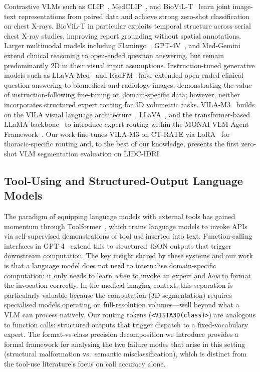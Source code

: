 \documentclass[lineno,referee,pdflatex,sn-mathphys-num]{sn-jnl}
\begin{document}
Contrastive VLMs such as CLIP~\cite{clip2021}, MedCLIP~\cite{medclip2022},
and BioViL-T~\cite{biovilt2023} learn joint image-text representations from
paired data and achieve strong zero-shot classification on chest X-rays.
BioViL-T in particular exploits temporal structure across serial chest X-ray
studies, improving report grounding without spatial annotations.
Larger multimodal models including Flamingo~\cite{flamingo2022},
GPT-4V~\cite{gpt4_2023}, and Med-Gemini~\cite{medgemini2024} extend
clinical reasoning to open-ended question answering, but remain
predominantly 2D in their visual input assumptions.
Instruction-tuned generative models such as LLaVA-Med~\cite{llava_med2023}
and RadFM~\cite{radfm2023} have extended open-ended clinical question
answering to biomedical and radiology images, demonstrating the value of
instruction-following fine-tuning on domain-specific data; however,
neither incorporates structured expert routing for 3D volumetric tasks.
VILA-M3~\cite{vilaM32024} builds on the VILA visual language
architecture~\cite{vila2024}, LLaVA~\cite{llava2023}, and the
transformer-based~\cite{transformer2017} LLaMA backbone~\cite{llama2023}
to introduce expert routing within the MONAI VLM Agent
Framework~\cite{monai2022}. Our work fine-tunes VILA-M3 on CT-RATE via
LoRA~\cite{lora2022} for thoracic-specific routing and, to the best of
our knowledge, presents the first zero-shot VLM segmentation evaluation
on LIDC-IDRI.

\subsection{Tool-Using and Structured-Output Language Models}

The paradigm of equipping language models with external tools has gained
momentum through Toolformer~\cite{schick2023toolformer}, which trains
language models to invoke APIs via self-supervised demonstrations of
tool use inserted into text. Function-calling interfaces in
GPT-4~\cite{gpt4_2023} extend this to structured JSON outputs that trigger
downstream computation.
The key insight shared by these systems and our work is that a language
model does not need to internalise domain-specific computation: it only
needs to learn \emph{when} to invoke an expert and \emph{how} to format
the invocation correctly. In the medical imaging context, this separation
is particularly valuable because the computation (3D segmentation)
requires specialised models operating on full-resolution volumes---well
beyond what a VLM can process natively. Our routing tokens
(\texttt{<VISTA3D(class)>}) are analogous to function calls: structured
outputs that trigger dispatch to a fixed-vocabulary expert. The
format-vs-class precision decomposition we introduce provides a formal
framework for analysing the two failure modes that arise in this setting
(structural malformation vs.\ semantic misclassification), which is
distinct from the tool-use literature's focus on call accuracy alone.
\end{document}
